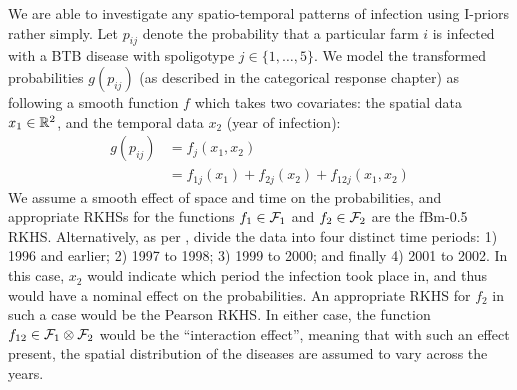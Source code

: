 \documentclass[a4paper,showframe,11pt]{report}\usepackage[]{graphicx}\usepackage[]{color}
\begin{document}
We are able to investigate any spatio-temporal patterns of infection using I-priors rather simply.
Let $p_{ij}$ denote the probability that a particular farm $i$ is infected with a BTB disease with spoligotype $j \in \{1,\dots,5\}$.
We model the transformed probabilities $g(p_{ij})$ (as described in the categorical response chapter) as following a smooth function $f$ which takes two covariates: the spatial data $x_1 \in \mathbb{R}^2$, and the temporal data $x_2$ (year of infection):
\begin{align*}
  g(p_{ij}) &= f_j(x_1, x_2) \\
  &= f_{1j}(x_1) + f_{2j}(x_2) + f_{12j}(x_1, x_2)
\end{align*}
We assume a smooth effect of space and time on the probabilities, and appropriate RKHSs for the functions $f_1 \in {\mathcal F}_1$ and $f_2 \in {\mathcal F}_2$ are the fBm-0.5 RKHS.
Alternatively, as per \citet{diggle2005nonparametric}, divide the data into four distinct time periods:
1) 1996 and earlier;
2) 1997 to 1998;
3) 1999 to 2000;
and finally 4) 2001 to 2002.
In this case, $x_2$ would indicate which period the infection took place in, and thus would have a nominal effect on the probabilities.
An appropriate RKHS for $f_2$ in such a case would be the Pearson RKHS.
In either case, the function $f_{12} \in {\mathcal F}_1 \otimes {\mathcal F}_2$ would be the ``interaction effect'', meaning that with such an effect present, the spatial distribution of the diseases are assumed to vary across the years.
\end{document}
